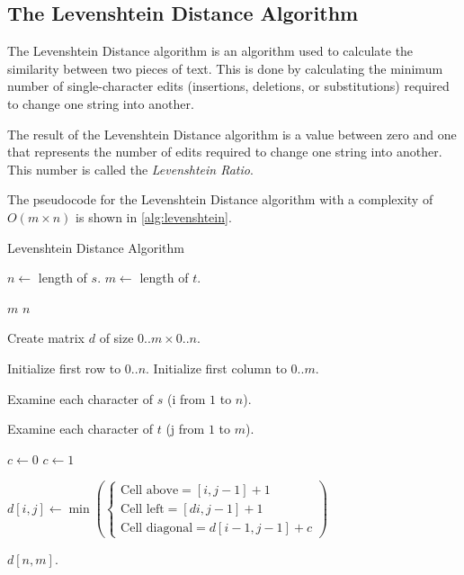  \subsection{The Levenshtein Distance Algorithm}
 \label{ssec:t-levenshtein}

 The Levenshtein Distance algorithm is an algorithm used to calculate the similarity between two
 pieces of text. This is done by calculating the minimum number of single-character edits
 (insertions, deletions, or substitutions) required to change one string into another.\cite{po2020similarity}

 The result of the Levenshtein Distance algorithm is a value between zero and one
 that represents the number of edits required to change one string into another.
 This number is called the \textit{Levenshtein Ratio}.

 The pseudocode for the Levenshtein Distance algorithm with a complexity of $O(m \times n)$
 is shown in \autoref{alg:levenshtein}.

 \begin{algorithm}
   \small
   \caption{Levenshtein Distance Algorithm\cite{po2020similarity}}
   \label{alg:levenshtein}
   \begin{algorithmic}[1]
       \State $n \gets$ length of $s$.
       \State $m \gets$ length of $t$.

         \State \Return $m$
       \EndIf
         \State \Return $n$
       \EndIf

       \State Create matrix $d$ of size $0..m \times 0..n$.

       \State Initialize first row to $0..n$.
       \State Initialize first column to $0..m$.

       \State Examine each character of $s$ (i from $1$ to $n$).

       \State Examine each character of $t$ (j from $1$ to $m$).

         \State $c \gets 0$
       \Else
         \State $c \gets 1$
       \EndIf

      \State $d[i,j] \gets \min(
        \begin{cases}
          \text{Cell above} = [i,j-1] + 1 \\
          \text{Cell left} = [di,j-1] + 1 \\
          \text{Cell diagonal} = d[i-1,j-1] + c
        \end{cases}
      )$

      \State \Return $d[n,m]$.

    \EndFunction
  \end{algorithmic}
\end{algorithm}
